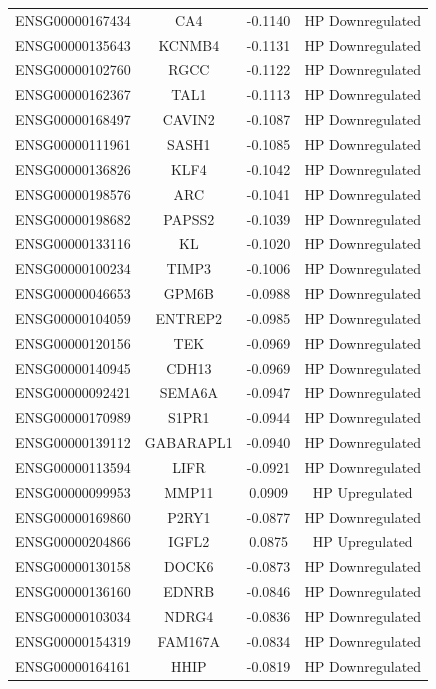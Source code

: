 \documentclass[
]{article}
\begin{document}
\begin{singlespace}
\begin{longtable}[t]{lccc}
\addlinespace
ENSG00000167434 & CA4 & -0.1140 & HP Downregulated\\
ENSG00000135643 & KCNMB4 & -0.1131 & HP Downregulated\\
ENSG00000102760 & RGCC & -0.1122 & HP Downregulated\\
ENSG00000162367 & TAL1 & -0.1113 & HP Downregulated\\
ENSG00000168497 & CAVIN2 & -0.1087 & HP Downregulated\\
\addlinespace
ENSG00000111961 & SASH1 & -0.1085 & HP Downregulated\\
ENSG00000136826 & KLF4 & -0.1042 & HP Downregulated\\
ENSG00000198576 & ARC & -0.1041 & HP Downregulated\\
ENSG00000198682 & PAPSS2 & -0.1039 & HP Downregulated\\
ENSG00000133116 & KL & -0.1020 & HP Downregulated\\
\addlinespace
ENSG00000100234 & TIMP3 & -0.1006 & HP Downregulated\\
ENSG00000046653 & GPM6B & -0.0988 & HP Downregulated\\
ENSG00000104059 & ENTREP2 & -0.0985 & HP Downregulated\\
ENSG00000120156 & TEK & -0.0969 & HP Downregulated\\
ENSG00000140945 & CDH13 & -0.0969 & HP Downregulated\\
\addlinespace
ENSG00000092421 & SEMA6A & -0.0947 & HP Downregulated\\
ENSG00000170989 & S1PR1 & -0.0944 & HP Downregulated\\
ENSG00000139112 & GABARAPL1 & -0.0940 & HP Downregulated\\
ENSG00000113594 & LIFR & -0.0921 & HP Downregulated\\
ENSG00000099953 & MMP11 & 0.0909 & HP Upregulated\\
\addlinespace
ENSG00000169860 & P2RY1 & -0.0877 & HP Downregulated\\
ENSG00000204866 & IGFL2 & 0.0875 & HP Upregulated\\
ENSG00000130158 & DOCK6 & -0.0873 & HP Downregulated\\
ENSG00000136160 & EDNRB & -0.0846 & HP Downregulated\\
ENSG00000103034 & NDRG4 & -0.0836 & HP Downregulated\\
\addlinespace
ENSG00000154319 & FAM167A & -0.0834 & HP Downregulated\\
ENSG00000164161 & HHIP & -0.0819 & HP Downregulated\\

\end{longtable}
\end{singlespace}
\end{document}
